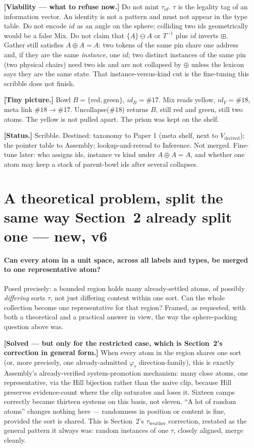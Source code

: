 \documentclass[11pt]{article}
\begin{document}
\textbf{[Viability --- what to refuse now.]}
Do not mint $\tau_{id}$. $\tau$ is the legality tag of an information
vector. An identity is not a pattern and must not appear in the type
table. Do not encode $id$ as an angle on the sphere; colliding two
ids geometrically would be a false Mix. Do not claim that
$\{A\}\ominus A$ or $T^{-1}$ plus $id$ inverts $\boxplus$. Gather
still satisfies $A\oplus A=A$: two tokens of the same pin share one
address and, if they are the same \emph{instance}, one $id$; two
distinct instances of the same pin (two physical chairs) need two
ids and are not collapsed by $\oplus$ unless the lexicon says they
are the same state. That instance-versus-kind cut is the fine-tuning
this scribble does not finish.

\textbf{[Tiny picture.]}
Bowl $B=\{\mathrm{red},\mathrm{green}\}$, $id_B=\#17$.
Mix reads yellow, $id_Y=\#18$, meta link $\#18\to\#17$.
Uncollapse($\#18$) returns $B$, still red and green, still two atoms.
The yellow is not pulled apart. The prism was kept on the shelf.

\textbf{[Status.]} Scribble. Destined: taxonomy to Paper 1 (meta
shelf, next to $V_{\mathrm{derived}}$); the pointer table to
Assembly; lookup-and-reread to Inference. Not merged. Fine-tune
later: who assigns ids, instance vs kind under $A\oplus A=A$, and
whether one atom may keep a stack of parent-bowl ids after several
collapses.

\section{A theoretical problem, split the same way Section~2 already
split one --- new, v6}

\paragraph{Can every atom in a unit space, across all labels and
types, be merged to one representative atom?} Posed precisely: a
bounded region holds many already-settled atoms, of possibly
\emph{differing} sorts $\tau$, not just differing content within one
sort. Can the whole collection become one representative for that
region? Framed, as requested, with both a theoretical and a practical
answer in view, the way the sphere-packing question above was.

\textbf{[Solved --- but only for the restricted case, which is
Section~2's correction in general form.]} When every atom in the
region shares one sort (or, more precisely, one already-admitted
$\varphi_\tau$ direction-family), this is exactly
Assembly's already-verified system-promotion mechanism: many close
atoms, one representative, via the Hill bijection rather than the
naive clip, because Hill preserves evidence-count where the clip
saturates and loses it. Sixteen camps correctly became thirteen
systems on this basis, not eleven. ``A lot of random atoms'' changes
nothing here --- randomness in position or content is fine, provided
the sort is shared. This is Section~2's $\tau_{\text{weather}}$
correction, restated as the general pattern it always was: random
instances of one $\tau$, closely aligned, merge cleanly.
\end{document}
